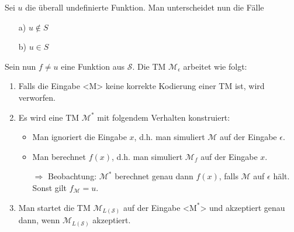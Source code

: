 \documentclass{scrartcl}%
\begin{document}
    \vspace*{0.3cm}
    Sei $u$ die überall undefinierte Funktion. Man unterscheidet nun die Fälle
    \begin{itemize}
        \item [a)] $u \notin S$
        \item [b)] $u \in S$
    \end{itemize}

    \newpage
    Sein nun $f \neq u$ eine Funktion aus $\mathcal{S}$. Die TM $\mathcal{M}_\epsilon$ arbeitet wie folgt:
    \begin{enumerate}
        \item Falls die Eingabe <M> keine korrekte Kodierung einer TM ist, wird verworfen.
        \item Es wird eine TM $\mathcal{M}^*$ mit folgendem Verhalten konstruiert:
        \begin{itemize}
            \item Man ignoriert die Eingabe $x$, d.h. man simuliert $\mathcal{M}$ auf der Eingabe $\epsilon$.
            \item Man berechnet $f(x)$, d.h. man simuliert $\mathcal{M}_f$ auf der Eingabe $x$.
            \item [$\Rightarrow$] Beobachtung: $\mathcal{M}^*$ berechnet genau dann $f(x)$,
            falls $\mathcal{M}$ auf $\epsilon$ hält. Sonst gilt $f_{\mathcal{M}} = u$.
        \end{itemize}
        \item Man startet die TM $\mathcal{M}_{L(\mathcal{S})}$ auf der Eingabe <$\text{M}^*$> und akzeptiert genau dann,
        wenn $\mathcal{M}_{L(\mathcal{S})}$ akzeptiert.
    \end{enumerate}
\end{document}
